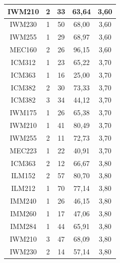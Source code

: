 \documentclass[12pt]{article}
\begin{document}
\begin{table}[H]
{{\begin{minipage}[b]{.5\hsize}
{\begin{tabular}{|c|c|c|c|c|}
            \rowcolor[HTML]{DAEBFB} 
            IWM210 & 2 & 33 & 63,64 & 3,60 \\ \hline
            \rowcolor[HTML]{DAEBFB} 
            IWM230 & 1 & 50 & 68,00 & 3,60 \\ \hline
            \rowcolor[HTML]{DAEBFB} 
            IWM255 & 1 & 29 & 68,97 & 3,60 \\ \hline
            \rowcolor[HTML]{DAEBFB} 
            MEC160 & 2 & 26 & 96,15 & 3,60 \\ \hline
            \rowcolor[HTML]{DAEBFB} 
            ICM312 & 1 & 23 & 65,22 & 3,70 \\ \hline
            \rowcolor[HTML]{DAEBFB} 
            ICM363 & 1 & 16 & 25,00 & 3,70 \\ \hline
            \rowcolor[HTML]{DAEBFB} 
            ICM382 & 2 & 30 & 73,33 & 3,70 \\ \hline
            \rowcolor[HTML]{DAEBFB} 
            ICM382 & 3 & 34 & 44,12 & 3,70 \\ \hline
            \rowcolor[HTML]{DAEBFB} 
            IWM175 & 1 & 26 & 65,38 & 3,70 \\ \hline
            \rowcolor[HTML]{DAEBFB} 
            IWM210 & 1 & 41 & 80,49 & 3,70 \\ \hline
            \rowcolor[HTML]{DAEBFB} 
            IWM255 & 2 & 11 & 72,73 & 3,70 \\ \hline
            \rowcolor[HTML]{DAEBFB} 
            MEC223 & 1 & 22 & 40,91 & 3,70 \\ \hline
            \rowcolor[HTML]{DAEBFB} 
            ICM363 & 2 & 12 & 66,67 & 3,80 \\ \hline
            \rowcolor[HTML]{DAEBFB} 
            ILM152 & 2 & 57 & 80,70 & 3,80 \\ \hline
            \rowcolor[HTML]{DAEBFB} 
            ILM212 & 1 & 70 & 77,14 & 3,80 \\ \hline
            \rowcolor[HTML]{DAEBFB} 
            IMM240 & 1 & 26 & 46,15 & 3,80 \\ \hline
            \rowcolor[HTML]{DAEBFB} 
            IMM260 & 1 & 17 & 47,06 & 3,80 \\ \hline
            \rowcolor[HTML]{DAEBFB} 
            IMM284 & 1 & 44 & 65,91 & 3,80 \\ \hline
            \rowcolor[HTML]{DAEBFB} 
            IWM210 & 3 & 47 & 68,09 & 3,80 \\ \hline
            \rowcolor[HTML]{DAEBFB} 
            IWM230 & 2 & 14 & 57,14 & 3,80 \\ \hline

\end{tabular}}
\end{minipage}}}
\end{table}
\end{document}
